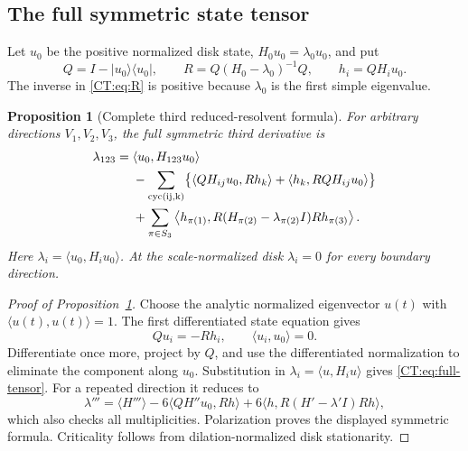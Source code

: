 \documentclass[11pt]{amsart}
\numberwithin{equation}{section}
\newtheorem{proposition}[theorem]{Proposition}
\theoremstyle{definition}
\theoremstyle{remark}
\begin{document}
\subsection{The full symmetric state tensor}

Let $u_0$ be the positive normalized disk state, $H_0u_0=\lambda_0u_0$,
and put
\begin{equation}\label{CT:eq:R}
 Q=I-|u_0\rangle\langle u_0|,
 \qquad R=Q(H_0-\lambda_0)^{-1}Q,
 \qquad h_i=QH_iu_0.
\end{equation}
The inverse in \eqref{CT:eq:R} is positive because $\lambda_0$ is the first
simple eigenvalue.

\begin{proposition}[Complete third reduced-resolvent formula]
\label{CT:prop:full-tensor}
For arbitrary directions $V_1,V_2,V_3$, the full symmetric third
derivative is
\begin{align}
 \lambda_{123}={}&\langle u_0,H_{123}u_0\rangle\label{CT:eq:full-tensor}\\
 &-\sum_{\rm cyc(ij,k)}
 \bigl\{\langle QH_{ij}u_0,Rh_k\rangle
          +\langle h_k,RQH_{ij}u_0\rangle\bigr\}\notag\\
 &+\sum_{\pi\in S_3}
 \left\langle h_{\pi(1)},
 R(H_{\pi(2)}-\lambda_{\pi(2)}I)R
 h_{\pi(3)}\right\rangle.\notag
\end{align}
Here $\lambda_i=\langle u_0,H_iu_0\rangle$.  At the scale-normalized disk
$\lambda_i=0$ for every boundary direction.
\end{proposition}

\begin{proof}[Proof of Proposition~\ref{CT:prop:full-tensor}]
Choose the analytic normalized eigenvector $u(t)$ with
$\langle u(t),u(t)\rangle=1$.  The first differentiated state equation
gives
\begin{equation}\label{CT:eq:first-state}
 Qu_i=-Rh_i,
 \qquad \langle u_i,u_0\rangle=0.
\end{equation}
Differentiate once more, project by $Q$, and use the differentiated
normalization to eliminate the component along $u_0$.  Substitution in
$\lambda_i=\langle u,H_iu\rangle$ gives \eqref{CT:eq:full-tensor}.
For a repeated direction it reduces to
\[
 \lambda'''=\langle H'''\rangle
 -6\langle QH''u_0,Rh\rangle
 +6\langle h,R(H'-\lambda'I)Rh\rangle,
\]
which also checks all multiplicities.  Polarization proves the displayed
symmetric formula.  Criticality follows from dilation-normalized disk
stationarity.
\end{proof}
\end{document}
